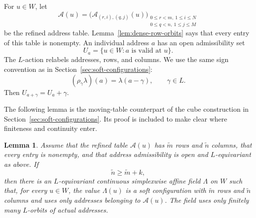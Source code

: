 \documentclass[11pt,reqno]{amsart}
\numberwithin{equation}{section}
\newtheorem{lemma}[theorem]{Lemma}
\theoremstyle{definition}
\theoremstyle{remark}
\begin{document}
For $u\in W$, let
\[
 \mathcal A(u)
 =\bigl(\mathcal A_{(r,i),(q,j)}(u)\bigr)_{
   \substack{0\le r<m,\ 1\le i\le N\\
             0\le q<n,\ 1\le j\le M}}
\]
be the refined address table.  Lemma~\ref{lem:dense-row-orbits} says that
every entry of this table is nonempty.  An individual address $a$ has an open
admissibility set
\[
 U_a=\{u\in W:a\text{ is valid at }u\}.
\]
The $L$-action relabels addresses, rows, and columns.  We use the same sign
convention as in Section~\ref{sec:soft-configurations}:
\[
 (\rho_\gamma\lambda)(a)=\lambda(a-\gamma),
 \qquad \gamma\in L.
\]
Then $U_{a+\gamma}=U_a+\gamma$.

The following lemma is the moving-table counterpart of the cube construction
in Section~\ref{sec:soft-configurations}.  Its proof is included to make clear where finiteness and
continuity enter.

\begin{lemma}\label{lem:moving-address-field}
Assume that the refined table $\mathcal A(u)$ has
$\widetilde m$ rows and $\widetilde n$ columns, that every entry is nonempty,
and that address admissibility is open and $L$-equivariant as above.  If
\[
 \widetilde n\ge\widetilde m+k,
\]
then there is an $L$-equivariant continuous simplexwise affine field
$\Lambda$ on $W$ such that, for every $u\in W$, the value $\Lambda(u)$ is a
soft configuration with $\widetilde m$ rows and $\widetilde n$ columns and
uses only addresses belonging to $\mathcal A(u)$.  The field uses only finitely many $L$-orbits of actual addresses.
\end{lemma}
\end{document}
